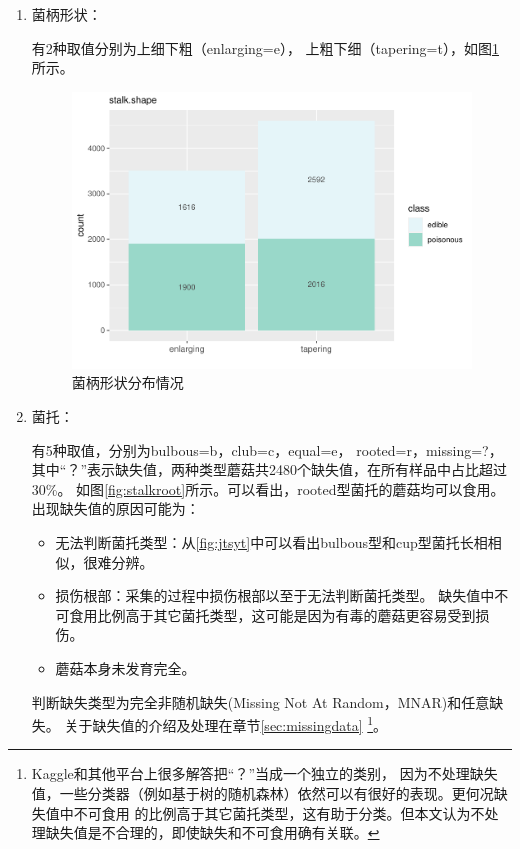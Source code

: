 \documentclass[lang=cn,11pt,a4paper,cite=super]{elegantpaper}
\begin{document}
\begin{enumerate}
   \item 菌柄形状：\par 有2种取值分别为上细下粗（enlarging=e），
   上粗下细（tapering=t），如图\ref{fig:ss}所示。
   \begin{figure}[phtb]
      \centering
      \includegraphics[width=0.7\linewidth]{img/stalkshape-1.pdf}
      \caption{菌柄形状分布情况}
      \label{fig:ss}
   \end{figure}

   \item\label{item:1} 菌托：\par 有5种取值，分别为bulbous=b，club=c，equal=e，
   rooted=r，missing=?，其中“？”表示缺失值，两种类型蘑菇共2480个缺失值，在所有样品中占比超过30\%。
   如图\ref{fig:stalkroot}所示。可以看出，rooted型菌托的蘑菇均可以食用。
   出现缺失值的原因可能为：
   \begin{itemize}
      \item 无法判断菌托类型：从\ref{fig:jtsyt}中可以看出bulbous型和cup型菌托长相相似，很难分辨。
      \item 损伤根部：采集的过程中损伤根部以至于无法判断菌托类型。
      缺失值中不可食用比例高于其它菌托类型，这可能是因为有毒的蘑菇更容易受到损伤。
      \item 蘑菇本身未发育完全。
   \end{itemize}  
   判断缺失类型为完全非随机缺失(Missing Not At Random，MNAR)和任意缺失。
   关于缺失值的介绍及处理在章节\ref{sec:missingdata}   
   \footnote{Kaggle和其他平台上很多解答把“？”当成一个独立的类别，
   因为不处理缺失值，一些分类器（例如基于树的随机森林）依然可以有很好的表现。更何况缺失值中不可食用
   的比例高于其它菌托类型，这有助于分类。但本文认为不处理缺失值是不合理的，即使缺失和不可食用确有关联。}。
   

\end{enumerate}
\end{document}
